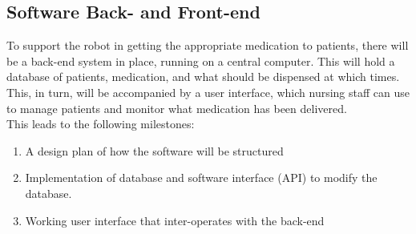 \documentclass[a4paper,10pt,DIV10,openright,openbib]{scrreprt}
\begin{document}
\subsection{Software Back- and Front-end}
To support the robot in getting the appropriate medication to patients, there will
be a back-end system in place, running on a central computer. This will hold a 
database of patients, medication, and what should be dispensed at which times. This, in
turn, will be accompanied by a user interface, which nursing staff can use to manage patients
and monitor what medication has been delivered. \\
This leads to the following milestones:
\begin{enumerate}
  \item A design plan of how the software will be structured
  \item Implementation of database and software interface (API) to modify the database.
  \item Working user interface that inter-operates with the back-end
\end{enumerate}


\end{document}
